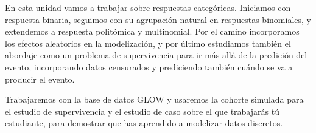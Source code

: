 \documentclass[
  letterpaper,
  DIV=11,
  numbers=noendperiod]{scrartcl}
\begin{document}
\begin{tcolorbox}[enhanced jigsaw, coltitle=black, rightrule=.15mm, arc=.35mm, leftrule=.75mm, colback=white, colbacktitle=quarto-callout-note-color!10!white, left=2mm, breakable, toptitle=1mm, toprule=.15mm, bottomtitle=1mm, titlerule=0mm, title=\textcolor{quarto-callout-note-color}{\faInfo}\hspace{0.5em}{Mapa del caso}, bottomrule=.15mm, opacityback=0, opacitybacktitle=0.6, colframe=quarto-callout-note-color-frame]

En esta unidad vamos a trabajar sobre respuestas categóricas. Iniciamos
con respuesta binaria, seguimos con su agrupación natural en respuestas
binomiales, y extendemos a respuesta politómica y multinomial. Por el
camino incorporamos los efectos aleatorios en la modelización, y por
último estudiamos también el abordaje como un problema de supervivencia
para ir más allá de la predición del evento, incorporando datos
censurados y prediciendo también cuándo se va a producir el evento.

Trabajaremos con la base de datos GLOW y usaremos la cohorte simulada
para el estudio de supervivencia y el estudio de caso sobre el que
trabajarás tú estudiante, para demostrar que has aprendido a modelizar
datos discretos.


\end{tcolorbox}
\end{document}
